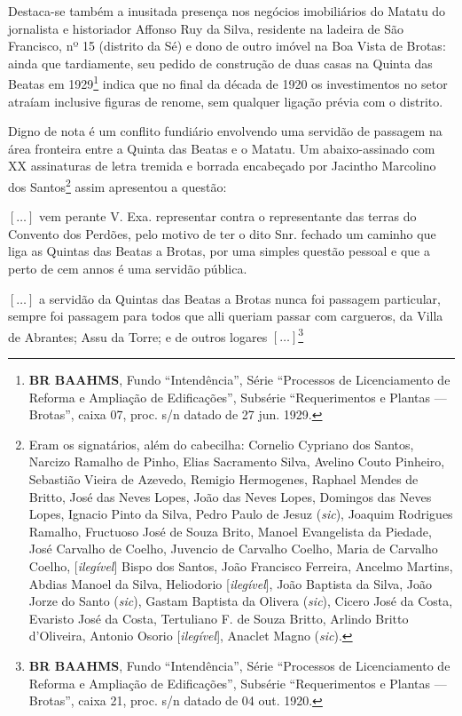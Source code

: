 Destaca-se também a inusitada presença nos negócios imobiliários do Matatu do jornalista e historiador Affonso Ruy da Silva, residente na ladeira de São Francisco, nº 15 (distrito da Sé) e dono de outro imóvel na Boa Vista de Brotas: ainda que tardiamente, seu pedido de construção de duas casas na Quinta das Beatas em 1929\footnote{\textbf{BR BAAHMS}, Fundo ``Intendência'', Série ``Processos de Licenciamento de Reforma e Ampliação de Edificações'', Subsérie ``Requerimentos e Plantas --- Brotas'', caixa 07, proc.  s/n datado de 27 jun. 1929.} indica que no final da década de 1920 os investimentos no setor atraíam inclusive figuras de renome, sem qualquer ligação prévia com o distrito.

Digno de nota é um conflito fundiário envolvendo uma servidão de passagem na área fronteira entre a Quinta das Beatas e o Matatu. Um abaixo-assinado com XX assinaturas de letra tremida e borrada encabeçado por Jacintho Marcolino dos Santos\footnote{Eram os signatários, além do cabecilha: Cornelio Cypriano dos Santos, Narcizo Ramalho de Pinho, Elias Sacramento Silva, Avelino Couto Pinheiro, Sebastião Vieira de Azevedo, Remigio Hermogenes, Raphael Mendes de Britto, José das Neves Lopes, João das Neves Lopes, Domingos das Neves Lopes, Ignacio Pinto da Silva, Pedro Paulo de Jesuz (\textit{sic}), Joaquim Rodrigues Ramalho, Fructuoso José de Souza Brito, Manoel Evangelista da Piedade, José Carvalho de Coelho, Juvencio de Carvalho Coelho, Maria de Carvalho Coelho, [\textit{ilegível}] Bispo dos Santos, João Francisco Ferreira, Ancelmo Martins, Abdias Manoel da Silva, Heliodorio [\textit{ilegível}], João Baptista da Silva, João Jorze do Santo (\textit{sic}), Gastam Baptista da Olivera (\textit{sic}), Cicero José da Costa, Evaristo José da Costa, Tertuliano F. de Souza Britto, Arlindo Britto d'Oliveira, Antonio Osorio [\textit{ilegível}], Anaclet Magno (\textit{sic}).} assim apresentou a questão:

\begin{citacao}
\([\dots]\) vem perante V. Exa. representar contra o representante das terras do Convento dos Perdões, pelo motivo de ter o dito Snr. fechado um caminho que liga as Quintas das Beatas a Brotas, por uma simples questão pessoal e que a perto de cem annos é uma servidão pública.

\([\dots]\) a servidão da Quintas das Beatas a Brotas nunca foi passagem particular, sempre foi passagem para todos que alli queriam passar com cargueros, da Villa de Abrantes; Assu da Torre; e de outros logares \([\dots]\)\footnote{\textbf{BR BAAHMS}, Fundo ``Intendência'', Série ``Processos de Licenciamento de Reforma e Ampliação de Edificações'', Subsérie ``Requerimentos e Plantas --- Brotas'', caixa 21, proc. s/n datado de 04 out. 1920.}
\end{citacao}


